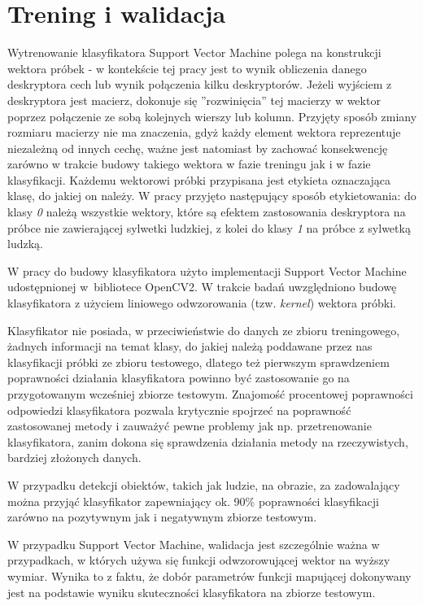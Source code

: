 \section{Trening i walidacja}
\label{sec:trening}

Wytrenowanie klasyfikatora Support Vector Machine polega na konstrukcji wektora próbek - w kontekście tej pracy jest to wynik obliczenia danego deskryptora cech lub wynik połączenia kilku deskryptorów. Jeżeli wyjściem z deskryptora jest macierz, dokonuje się ''rozwinięcia'' tej macierzy w wektor poprzez połączenie ze sobą kolejnych wierszy lub kolumn. Przyjęty sposób zmiany rozmiaru macierzy nie ma znaczenia, gdyż każdy element wektora reprezentuje niezależną od innych cechę, ważne jest natomiast by zachować konsekwencję zarówno w trakcie budowy takiego wektora w fazie treningu jak i w fazie klasyfikacji. Każdemu wektorowi próbki przypisana jest etykieta oznaczająca klasę, do jakiej on należy. W pracy przyjęto następujący sposób etykietowania: do klasy \textit{0} należą wszystkie wektory, które są efektem zastosowania deskryptora na próbce nie zawierającej sylwetki ludzkiej, z kolei do klasy \textit{1} na próbce z sylwetką ludzką.

W pracy do budowy klasyfikatora użyto implementacji Support Vector Machine udostępnionej w~bibliotece OpenCV2. W trakcie badań uwzględniono budowę klasyfikatora z użyciem liniowego odwzorowania (tzw. \textit{kernel}) wektora próbki.

Klasyfikator nie posiada, w przeciwieństwie do danych ze zbioru treningowego, żadnych informacji na temat klasy, do jakiej należą poddawane przez nas klasyfikacji próbki ze zbioru testowego, dlatego też pierwszym sprawdzeniem poprawności działania klasyfikatora powinno być zastosowanie go na przygotowanym wcześniej zbiorze testowym. Znajomość procentowej poprawności odpowiedzi klasyfikatora pozwala krytycznie spojrzeć na poprawność zastosowanej metody i zauważyć pewne problemy jak np. przetrenowanie klasyfikatora, zanim dokona się sprawdzenia działania metody na rzeczywistych, bardziej złożonych danych.

W przypadku detekcji obiektów, takich jak ludzie, na obrazie, za zadowalający można przyjąć klasyfikator zapewniający ok. 90\% poprawności klasyfikacji zarówno na pozytywnym jak i negatywnym zbiorze testowym.

W przypadku Support Vector Machine, walidacja jest szczególnie ważna w przypadkach, w których używa się funkcji odwzorowującej wektor na wyższy wymiar. Wynika to z faktu, że dobór parametrów funkcji mapującej dokonywany jest na podstawie wyniku skuteczności klasyfikatora na zbiorze testowym.

